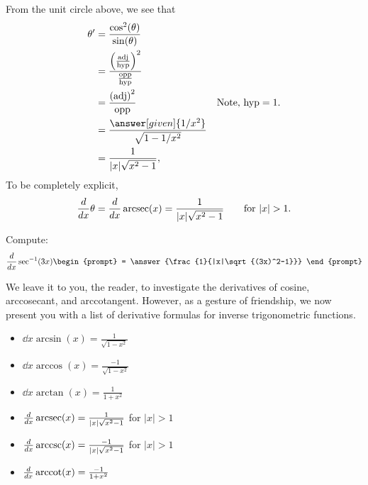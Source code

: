 \documentclass{ximera}
\begin{document}
\begin{theorem}
\begin{explanation}
\begin{image}
\end{image}
From the unit circle above, we see that 
\begin{align*}
  \theta' &= \frac{\cos^2(\theta)}{\sin(\theta)}\\
  &= \frac{
    \left(\frac{\mathrm{adj}}{\mathrm{hyp}}\right)^2}{\frac{\mathrm{opp}}{\mathrm{hyp}}}\\
  &= \frac{\left(\mathrm{adj}\right)^2}{\mathrm{opp}} &\text{Note, $\mathrm{hyp}=1$.}\\
  &= \frac{\answer[given]{1/x^2}}{\sqrt{1-1/x^2}}\\
  &= \frac{1}{|x|\sqrt{x^2-1}},
\end{align*}
To be completely explicit, 
\[
\ddx \theta = \ddx \arcsec(x) = \frac{1}{|x|\sqrt{x^2-1}}\qquad\text{for $|x|>1$}. 
\]
\end{explanation}
\end{theorem}

\begin{question}
  Compute:
  \[
  \ddx \sec^{-1}(3x)
  \begin{prompt}
    = \answer{\frac{1}{|x|\sqrt{(3x)^2-1}}}
  \end{prompt}
  \]
\end{question}

We leave it to you, the reader, to investigate the derivatives of
cosine, arccosecant, and arccotangent. However, as a gesture of
friendship, we now present you with a list of derivative formulas for
inverse trigonometric functions.

\begin{theorem} \hfil
\begin{itemize}
\item $\dd{x} \arcsin(x) = \frac{1}{\sqrt{1-x^2}}$
\item $\dd{x} \arccos(x) = \frac{-1}{\sqrt{1-x^2}}$
\item $\dd{x} \arctan(x) = \frac{1}{1+x^2}$
\item $\frac{\mathop{}\!d }{\mathop{}\!d x} \operatorname{arcsec}(x) = \frac{1}{|x|\sqrt{x^2-1}}$ for $|x|>1$
\item $\frac{\mathop{}\!d }{\mathop{}\!d x} \operatorname{arccsc}(x) = \frac{-1}{|x|\sqrt{x^2-1}}$ for $|x|>1$
\item $\frac{\mathop{}\!d }{\mathop{}\!d x} \operatorname{arccot}(x) = \frac{-1}{1+x^2}$
\end{itemize}
\end{theorem}
\end{document}
